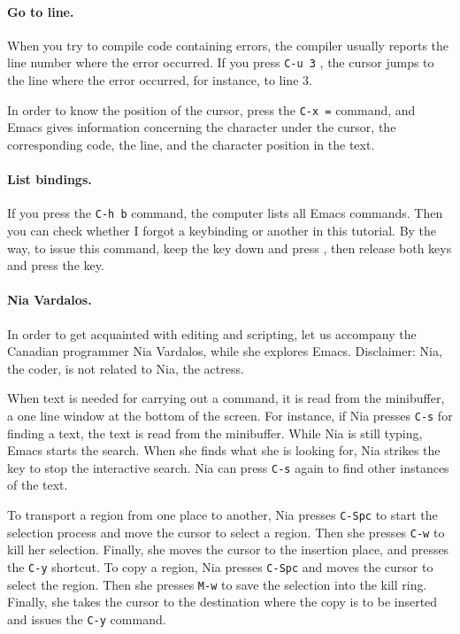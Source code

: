 \documentclass[a4paper,12pt]{book}
\begin{document}
\paragraph{Go to line.} When you try to compile
code containing errors, the compiler
usually reports the line number where the error occurred.
If you press \verb|C-u 3| ,
the cursor jumps to the line where the error occurred,
for instance, to line 3.

In order to know the position of the cursor, press
the \verb|C-x =| command, and Emacs gives information
concerning the character under the cursor, the corresponding
code, the line, and the character position in the text.

\paragraph{List bindings.} If you press
the \verb|C-h b| command, the computer
lists all Emacs commands. Then you
can check whether I forgot a keybinding or
another in this tutorial. By the way,
to issue this command, keep the 
key down and press , then release
both keys and press the  key.

\paragraph{Nia Vardalos.}
In order to get acquainted with editing and scripting,
let us accompany the Canadian programmer Nia Vardalos,
while she explores Emacs. Disclaimer: Nia, the coder,
is not related to Nia, the actress.

When text is needed for carrying out a command,
it is read from the minibuffer, a one line
window at the bottom of the screen. For instance, 
if Nia presses \verb|C-s| for finding a text, 
the text is read from the minibuffer. While Nia is
still typing, Emacs starts the search. When she finds
what she is looking for, Nia strikes the 
key to stop the interactive search. Nia can press
\verb|C-s| again to find other instances of the text. 

To transport a region from one place to another,
Nia presses \verb|C-Spc| to start
 the selection process and move the cursor to select
 a region.  Then she presses \verb|C-w| to kill her
 selection. Finally, she moves the cursor to the
 insertion place, and presses the \verb|C-y| shortcut.
To copy a region, Nia presses \verb|C-Spc| and moves
the cursor to select the region. Then she presses
\verb|M-w| to save the selection into the kill ring. Finally,
she takes the cursor to the destination where the copy is to
be inserted and issues the \verb|C-y| command.
\end{document}
